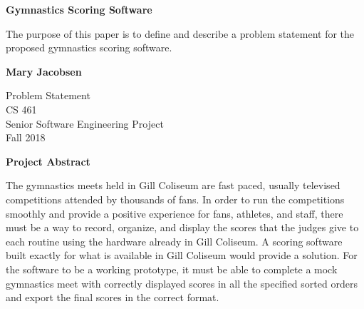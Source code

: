 \documentclass[letterpaper,10pt,draftclsnofoot,onecolumn,]{IEEEtran}
\begin{document}
\begin{titlepage}
    \begin{center}
        \vspace*{1cm}
        
        \textbf{Gymnastics Scoring Software}
        
        \vspace{0.5cm}
        The purpose of this paper is to define and describe a problem statement for the proposed gymnastics scoring software.
        
        \vspace{1.5cm}
        
        \textbf{Mary Jacobsen}
        
        Problem Statement\\
        CS 461\\
        Senior Software Engineering Project\\
        Fall 2018
        
    \end{center}
\end{titlepage}

\begin{center}
\textbf{Project Abstract}\\
\end{center}
The gymnastics meets held in Gill Coliseum are fast paced, usually televised competitions attended by thousands of fans. In order to run the competitions smoothly and provide a positive experience for fans, athletes, and staff, there must be a way to record, organize, and display the scores that the judges give to each routine using the hardware already in Gill Coliseum. A scoring software built exactly for what is available in Gill Coliseum would provide a solution. For the software to be a working prototype, it must be able to complete a mock gymnastics meet with correctly displayed scores in all the specified sorted orders and export the final scores in the correct format.\\
\end{document}
